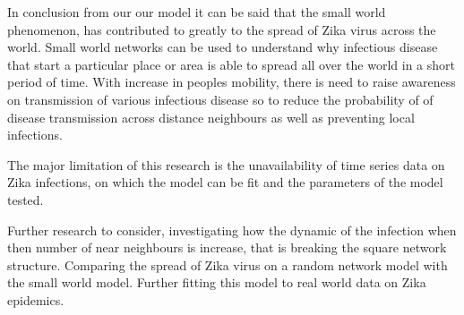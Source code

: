 In conclusion from our our model it can be said that the small world phenomenon, has contributed to greatly to the spread of Zika virus across the world. Small world networks can be used to understand why infectious disease that start a particular place or area is able to spread all over the world in a short period of time. With increase in peoples mobility, there is need to raise awareness on transmission of various infectious disease so to reduce the probability of of disease transmission across distance neighbours as well as preventing local infections.

The major limitation of this research is the unavailability of time series data on Zika infections, on which the model can be fit and the parameters of the model tested.

Further research to consider, investigating how the dynamic of the infection when then number of near neighbours is increase, that is breaking the square network structure. Comparing the spread of Zika virus on a random network model with the small world model. Further fitting this model to real world data on Zika epidemics.
